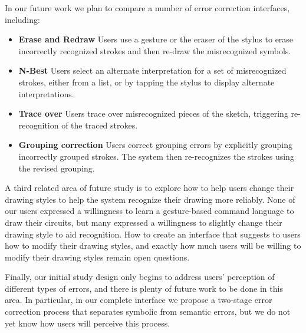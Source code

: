 \documentclass{elsart}
\begin{document}
In our future work we plan to compare a number of error correction
interfaces, including: 

\begin{itemize}
\item \textbf{Erase and Redraw} Users use a gesture or the eraser of
  the stylus to erase incorrectly recognized strokes and then re-draw
  the misrecognized symbols.
\item \textbf{N-Best} Users select an alternate interpretation for a
  set of misrecognized strokes, either from a list, or by tapping the
  stylus to display alternate interpretations.  
\item \textbf{Trace over} Users trace over misrecognized pieces of the
  sketch, triggering re-recognition of the traced strokes.
\item \textbf{Grouping correction} Users correct grouping errors by
  explicitly grouping incorrectly grouped strokes.  The system then
  re-recognizes the strokes using the revised grouping.  
\end{itemize}

A third related area of future study is to explore how to help users change
their drawing styles to help the system recognize their drawing more
reliably.  None of our users expressed a willingness to learn a
gesture-based command language to draw their circuits, but many
expressed a willingness to slightly change their drawing style to aid
recognition.  How to create an interface that suggests to users how to
modify their drawing styles, and exactly how much users will be willing
to modify their drawing styles remain open questions. 

Finally, our initial study design only begins to address users'
perception of different types of errors, and there is plenty of future
work to be done in this area.  In particular, in our complete
interface we propose a two-stage error correction process that
separates symbolic from semantic errors, but we do not yet know how
users will perceive this process.



\end{document}
